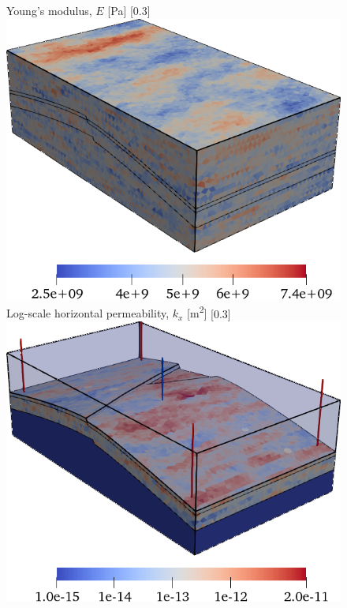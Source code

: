 \begin{figure} [htbp]
    \subcaptionbox
    {
        Young's modulus, $E$ [\unit{Pa}]
        \label{fig:mazumodel2_geosx_setup_young}
    }
    [0.3\textwidth]
    {
        \includegraphics[width=\linewidth]{figs/MazuModel2/geosx/young}
    }
    \hfill
    \subcaptionbox
    {
        Log-scale horizontal permeability, $k_x$ [\unit{m^2}]
        \label{fig:mazumodel2_geosx_setup_permx}
    }
    [0.3\textwidth]
    {
        \includegraphics[width=\linewidth]{figs/MazuModel2/geosx/permx}
    }

\end{figure}
